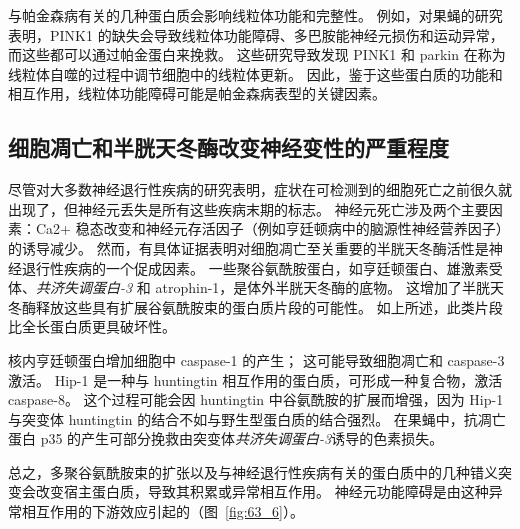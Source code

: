 与帕金森病有关的几种蛋白质会影响线粒体功能和完整性。
例如，对果蝇的研究表明，PINK1 的缺失会导致线粒体功能障碍、多巴胺能神经元损伤和运动异常，而这些都可以通过帕金蛋白来挽救。
这些研究导致发现 PINK1 和 parkin 在称为线粒体自噬的过程中调节细胞中的线粒体更新。
因此，鉴于这些蛋白质的功能和相互作用，线粒体功能障碍可能是帕金森病表型的关键因素。



\subsection{细胞凋亡和半胱天冬酶改变神经变性的严重程度}

尽管对大多数神经退行性疾病的研究表明，症状在可检测到的细胞死亡之前很久就出现了，但神经元丢失是所有这些疾病末期的标志。
神经元死亡涉及两个主要因素：Ca2+ 稳态改变和神经元存活因子（例如亨廷顿病中的脑源性神经营养因子）的诱导减少。
然而，有具体证据表明对细胞凋亡至关重要的半胱天冬酶活性是神经退行性疾病的一个促成因素。
一些聚谷氨酰胺蛋白，如亨廷顿蛋白、雄激素受体、\textit{共济失调蛋白-3} 和 atrophin-1，是体外半胱天冬酶的底物。
这增加了半胱天冬酶释放这些具有扩展谷氨酰胺束的蛋白质片段的可能性。
如上所述，此类片段比全长蛋白质更具破坏性。


核内亨廷顿蛋白增加细胞中 caspase-1 的产生； 这可能导致细胞凋亡和 caspase-3 激活。
Hip-1 是一种与 huntingtin 相互作用的蛋白质，可形成一种复合物，激活 caspase-8。
这个过程可能会因 huntingtin 中谷氨酰胺的扩展而增强，因为 Hip-1 与突变体 huntingtin 的结合不如与野生型蛋白质的结合强烈。
在果蝇中，抗凋亡蛋白 p35 的产生可部分挽救由突变体\textit{共济失调蛋白-3}诱导的色素损失。


总之，多聚谷氨酰胺束的扩张以及与神经退行性疾病有关的蛋白质中的几种错义突变会改变宿主蛋白质，导致其积累或异常相互作用。
神经元功能障碍是由这种异常相互作用的下游效应引起的（图~\ref{fig:63_6}）。


